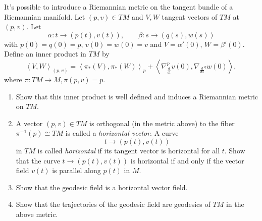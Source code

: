 \begin{exercise}
\label{exercise-geodesics-tangent-bundle}
It's possible to introduce a Riemannian metric on the tangent bundle
of a Riemannian manifold. Let $(p,v) \in TM$ and $V,W$ tangent vectors
of $TM$ at $(p,v)$. Let
$$
\alpha:t \to (p(t),v(t)),\qquad  \beta:s \to (q(s),w(s))
$$
with $p(0)=q(0)=p$, $v(0)=w(0)=v$
and $V=\alpha'(0)$, $W=\beta'(0)$.
Define an inner product in $TM$ by
\begin{equation}
\label{equation-tangent-bundle-metric}
\left<V,W\right>_{(p,v)}
=\left<\pi_*(V),\pi_*(W)\right>_p
+\left<\nabla^p_{\frac{d}{dt}}v(0),\nabla_{\frac{d}{ds}^q}w(0)\right>,
\end{equation}
where $\pi:TM \to M, \pi(p,v)=p$.

\begin{enumerate}
\item Show that this inner product is well defined
and induces a Riemannian metric on $TM$.

\item A vector $(p,v) \in TM$ is orthogonal
(in the metric above) to the fiber $\pi^{-1}(p) \cong TM$
is called a {\it horizontal vector}. A curve
$$
t \to (p(t),v(t))
$$
in $TM$ is called {\it horizontal} if its tangent vector is
horizontal for all $t$.
Show that the curve $t \to (p(t),v(t))$
is horizontal if and only if the vector field $v(t)$
is parallel along $p(t)$ in $M$.

\item Show that the geodesic field is a horizontal vector field.

\item Show that the trajectories of the geodesic field
are geodesics of $TM$ in the above metric.
\end{enumerate}
\end{exercise}

